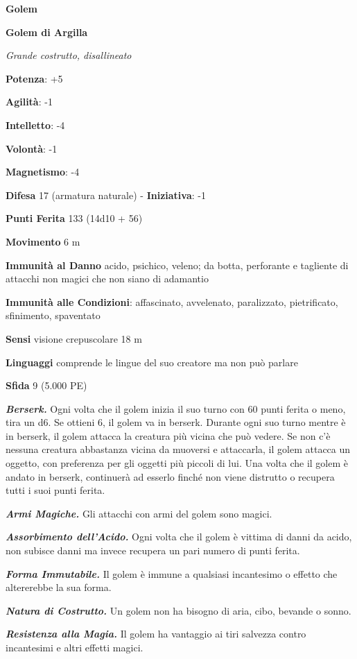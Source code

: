 \begin{multicols}{2}
\textbf{Golem}

\textbf{Golem di Argilla}

\emph{Grande costrutto, disallineato}

\textbf{Potenza}: +5

\textbf{Agilità}: -1

\textbf{Intelletto}: -4

\textbf{Volontà}: -1

\textbf{Magnetismo}: -4

\textbf{Difesa} 17 (armatura naturale) - \textbf{Iniziativa}: -1

\textbf{Punti Ferita} 133 (14d10 + 56)

\textbf{Movimento} 6 m

\textbf{Immunità al Danno} acido, psichico, veleno; da botta,
perforante e tagliente di attacchi non magici che non siano di adamantio

\textbf{Immunità alle Condizioni}: affascinato, avvelenato, paralizzato,
pietrificato, sfinimento, spaventato

\textbf{Sensi} visione crepuscolare 18 m

\textbf{Linguaggi} comprende le lingue del suo creatore ma non può
parlare

\textbf{Sfida} 9 (5.000 PE)\smallskip

\emph{\textbf{Berserk.}} Ogni volta che il golem inizia il suo turno con
60 punti ferita o meno, tira un d6. Se ottieni 6, il golem va in
berserk. Durante ogni suo turno mentre è in berserk, il golem attacca la
creatura più vicina che può vedere. Se non c'è nessuna creatura
abbastanza vicina da muoversi e attaccarla, il golem attacca un oggetto,
con preferenza per gli oggetti più piccoli di lui. Una volta che il
golem è andato in berserk, continuerà ad esserlo finché non viene
distrutto o recupera tutti i suoi punti ferita.

\emph{\textbf{Armi Magiche.}} Gli attacchi con armi del golem sono
magici.

\emph{\textbf{Assorbimento dell'Acido.}} Ogni volta che il golem è
vittima di danni da acido, non subisce danni ma invece recupera un pari
numero di punti ferita.

\emph{\textbf{Forma Immutabile.}} Il golem è immune a qualsiasi
incantesimo o effetto che altererebbe la sua forma.

\emph{\textbf{Natura di Costrutto.}} Un golem non ha bisogno di aria,
cibo, bevande o sonno.

\emph{\textbf{Resistenza alla Magia.}} Il golem ha vantaggio ai tiri
salvezza contro incantesimi e altri effetti magici.


\end{multicols}
